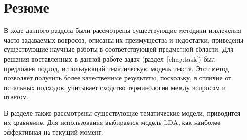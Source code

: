\section{Резюме}
\label{sec:overview_concl}

В ходе данного раздела были рассмотрены существующие методики извлечения часто задаваемых вопросов, описаны их преимущества и недостатки, приведены существующие научные работы в соответствующей предметной области. Для решения поставленных в данной работе задач (раздел~\ref{chap:task}) был предложен подход, использующий тематическую модель текста. Этот метод позволяет получить более качественные результаты, поскольку, в отличие от остальных подходов, учитывает сходство терминологии между вопросом и ответом.

В разделе также рассмотрены существующие тематические модели, приводится их сравнение. Для использования выбирается модель LDA, как наиболее эффективная на текущий момент.
